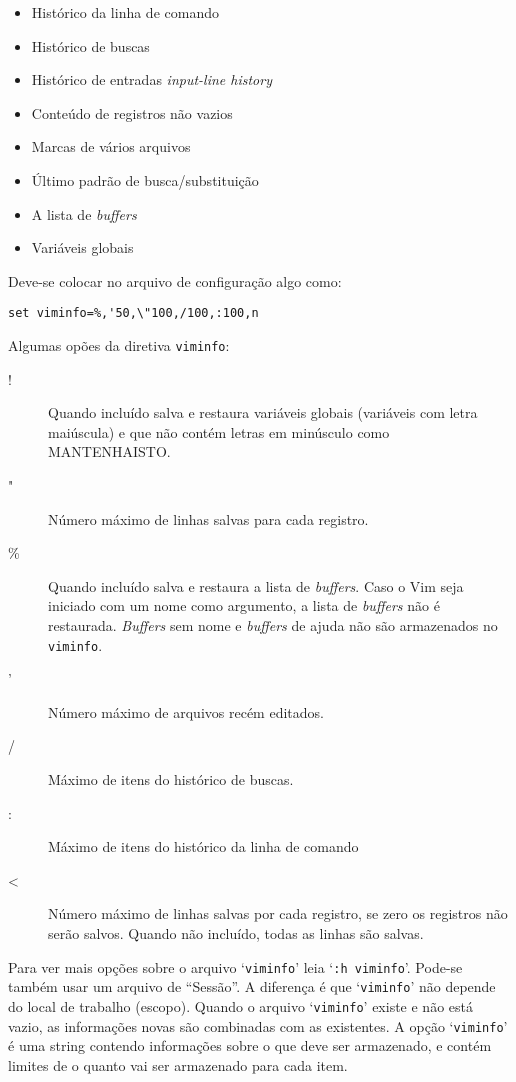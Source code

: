 \begin{itemize}
\item Histórico da linha de comando
\item Histórico de buscas
\item Histórico de entradas {\em input-line history}
\item Conteúdo de registros não vazios
\item Marcas de vários arquivos
\item Último padrão de busca/substituição 
\item A lista de {\em buffers}
\item Variáveis globais
\end{itemize}

Deve-se colocar no arquivo de configuração algo como:
 
\begin{verbatim}
set viminfo=%,'50,\"100,/100,:100,n
\end{verbatim}

Algumas opões da diretiva {\tt viminfo}:

\begin{description}
\item [!] Quando incluído salva e restaura variáveis globais (variáveis
com letra maiúscula) e que não contém letras em minúsculo como MANTENHAISTO.

\item ["] Número máximo de linhas salvas para cada registro.

\item [\%] Quando incluído salva e restaura a lista de {\em buffers}. Caso o Vim seja 
iniciado com um nome como argumento, a lista de {\em buffers} não é restaurada. {\em Buffers} sem
nome e {\em buffers} de ajuda não são armazenados no {\tt viminfo}.
                                      
\item ['] Número máximo de arquivos recém editados.

\item [/] Máximo de itens do histórico de buscas.

\item [:] Máximo de itens do histórico da linha de comando

\item [<] Número máximo de linhas salvas por cada registro, se zero
os registros não serão salvos. Quando não incluído, todas as linhas são salvas.

\end{description}

Para ver mais opções sobre o arquivo `{\tt viminfo}' leia `{\tt :h viminfo}'.
Pode-se também usar um arquivo de ``Sessão''. A diferença é que `{\tt viminfo}' não 
depende do local de trabalho (escopo).  
Quando o arquivo `{\tt viminfo}' existe e não está vazio, as informações novas
são combinadas com as existentes. A opção `{\tt viminfo}' é uma string contendo
informações sobre o que deve ser armazenado, e contém limites de o quanto 
vai ser armazenado para cada item.

